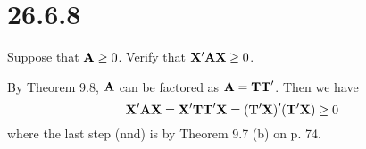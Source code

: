 \section*{26.6.8}
Suppose that ${\bf A}\ge0$. Verify that ${\bf X}'{\bf AX}\ge0$.

\bigskip
\noindent
By Theorem 9.8, $\bf A$ can be factored as ${\bf A}={\bf TT}'$.
Then we have
$${\bf X}'{\bf AX}={\bf X}'{\bf TT}'{\bf X}=
({\bf T}'{\bf X})'({\bf T}'{\bf X})\ge0$$
where the last step (nnd) is by
Theorem 9.7 (b) on p. 74.
